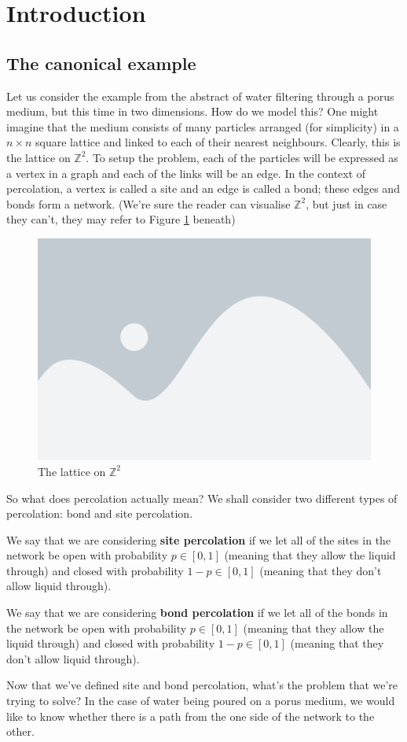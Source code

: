 \section{Introduction}
\subsection{The canonical example}
Let us consider the example from the abstract of water filtering through a porus medium, but this time in two dimensions. How do we model this? One might imagine that the medium consists of
many particles arranged (for simplicity) in a $n \times n$ square lattice and linked to each of their nearest neighbours. Clearly, this is the lattice on $\mathbb{Z}^2$. To setup the problem,
each of the particles will be expressed as a vertex in a graph and each of the links will be an edge. In the context of percolation, a vertex is called a site and an edge is
called a bond; these edges and bonds form a network. (We're sure the reader can visualise $\mathbb{Z}^2$, but just in case they can't, they may refer to Figure
\ref{fig:squarelattice} beneath) \\

\begin{figure}[h]
  \includegraphics[width=\linewidth]{placeholder}
  \caption{The lattice on $\mathbb{Z}^2$}
  \label{fig:squarelattice}
\end{figure}

So what does percolation actually mean? We shall consider two different types of percolation: bond and site percolation.

\begin{definition}
  We say that we are considering \textbf{site percolation} if we let all of the sites in the network be open with probability $p \in [0, 1]$ (meaning that they allow the liquid
  through) and closed with probability $1-p \in [0, 1]$ (meaning that they don't allow liquid through).
\end{definition}
\begin{definition}
  We say that we are considering \textbf{bond percolation} if we let all of the bonds in the network be open with probability $p \in [0, 1]$ (meaning that they allow the liquid
  through) and closed with probability $1-p \in [0, 1]$ (meaning that they don't allow liquid through).
\end{definition}

Now that we've defined site and bond percolation, what's the problem that we're trying to solve? In the case of water being poured on a porus medium, we would like to know
whether there is a path from the one side of the network to the other. 
